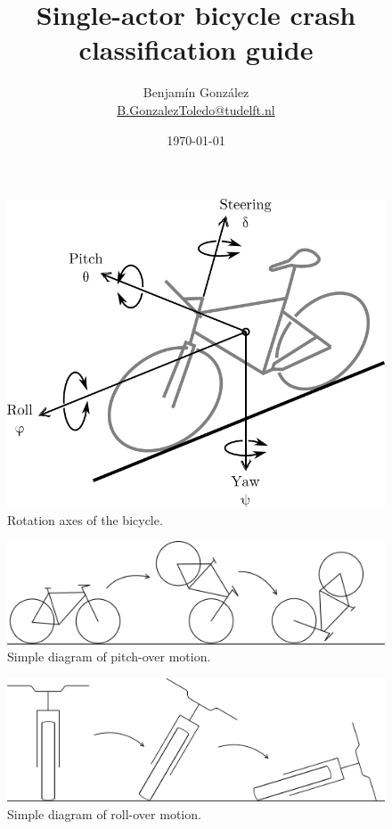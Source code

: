 \documentclass{article}
\title{Single-actor bicycle crash classification guide}
\author{
  Benjam\'in Gonz\'alez\\
  \small{\href{mailto:b.gonzaleztoledo@tudelft.nl}{B.GonzalezToledo@tudelft.nl}}
  }
\date{\today}
\begin{document}
\maketitle


\begin{figure}[h]
    \centering
    \includegraphics[scale=1.0]{bike-dof.png}
    \caption{Rotation axes of the bicycle.}
    \label{fig: bike-dof}
\end{figure}

\begin{figure}[h]
    \centering
    \includegraphics[width=\linewidth]{pitch-over.png}
    \caption{Simple diagram of pitch-over motion.}
    \label{fig: pitchover}
\end{figure}

\begin{figure}[h]
    \centering
    \includegraphics[width=\linewidth]{roll-over.png}
    \caption{Simple diagram of roll-over motion.}
    \label{fig: rollover}
\end{figure}
\end{document}
